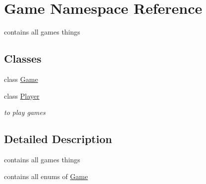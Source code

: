\hypertarget{namespace_game}{}\section{Game Namespace Reference}
\label{namespace_game}


contains all game\textquotesingle{}s things  


\subsection*{Classes}
\begin{DoxyCompactItemize}
\item 
class \hyperlink{class_game_1_1_game}{Game}
\item 
class \hyperlink{class_game_1_1_player}{Player}
\begin{DoxyCompactList}\small\item\em to play games \end{DoxyCompactList}\end{DoxyCompactItemize}


\subsection{Detailed Description}
contains all game\textquotesingle{}s things 

contains all enums of \hyperlink{class_game}{Game} 